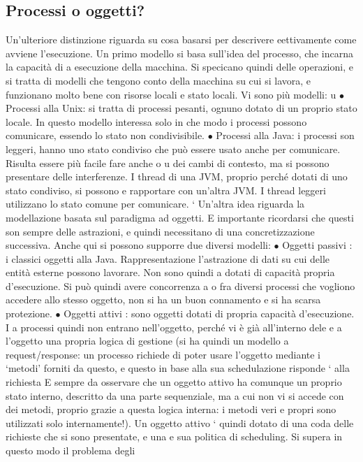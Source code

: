 \documentclass[a4paper,12pt]{article}
\begin{document}
\subsection{Processi o oggetti?}
Un'ulteriore distinzione riguarda su cosa basarsi per descrivere eettivamente
come avviene l'esecuzione.
Un primo modello si basa sull'idea del processo, che incarna la capacità di
a
esecuzione della macchina. Si specicano quindi delle operazioni, e si tratta di
modelli che tengono conto della macchina su cui si lavora, e funzionano molto
bene con risorse locali e stato locali. Vi sono più modelli:
u
$\bullet$ Processi alla Unix: si tratta di processi pesanti, ognuno dotato di un
proprio stato locale. In questo modello interessa solo in che modo i processi
possono comunicare, essendo lo stato non condivisibile.
$\bullet$ Processi alla Java: i processi son leggeri, hanno uno stato condiviso che
può essere usato anche per comunicare. Risulta essere più facile fare anche
o
u
dei cambi di contesto, ma si possono presentare delle interferenze.
I thread di una JVM, proprio perché dotati di uno stato condiviso, si possono
e
rapportare con un'altra JVM. I thread leggeri utilizzano lo stato comune per
comunicare.
`
Un'altra idea riguarda la modellazione basata sul paradigma ad oggetti. E
importante ricordarsi che questi son sempre delle astrazioni, e quindi necessitano
di una concretizzazione successiva. Anche qui si possono supporre due diversi
modelli:
$\bullet$ Oggetti passivi : i classici oggetti alla Java. Rappresentazione l'astrazione
di dati su cui delle entità esterne possono lavorare. Non sono quindi
a
dotati di capacità propria d'esecuzione. Si può quindi avere concorrenza
a
o
fra diversi processi che vogliono accedere allo stesso oggetto, non si ha un
buon connamento e si ha scarsa protezione.
$\bullet$ Oggetti attivi : sono oggetti dotati di propria capacità d'esecuzione. I
a
processi quindi non entrano nell'oggetto, perché vi è già all'interno dele
e a
l'oggetto una propria logica di gestione (si ha quindi un modello a request/response: un processo richiede di poter
usare l'oggetto mediante i
{`}metodi' forniti da questo, e questo in base alla sua schedulazione risponde
`
alla richiesta E sempre da osservare che un oggetto attivo ha comunque
un proprio stato interno, descritto da una parte sequenziale, ma a cui
non vi si accede con dei metodi, proprio grazie a questa logica interna: i
metodi veri e propri sono utilizzati solo internamente!). Un oggetto attivo
` quindi dotato di una coda delle richieste che si sono presentate, e una
e
sua politica di scheduling. Si supera in questo modo il problema degli
\end{document}
